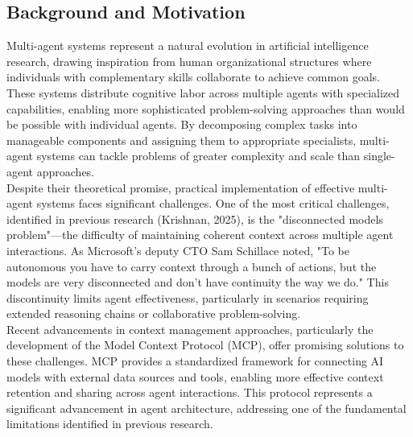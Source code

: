 \subsection{Background and Motivation}
Multi-agent systems represent a natural evolution in artificial intelligence research, drawing inspiration from human organizational structures where individuals with complementary skills collaborate to achieve common goals. These systems distribute cognitive labor across multiple agents with specialized capabilities, enabling more sophisticated problem-solving approaches than would be possible with individual agents. By decomposing complex tasks into manageable components and assigning them to appropriate specialists, multi-agent systems can tackle problems of greater complexity and scale than single-agent approaches.\\ \newline
Despite their theoretical promise, practical implementation of effective multi-agent systems faces significant challenges. One of the most critical challenges, identified in previous research (Krishnan, 2025), is the "disconnected models problem"—the difficulty of maintaining coherent context across multiple agent interactions. As Microsoft's deputy CTO Sam Schillace noted, "To be autonomous you have to carry context through a bunch of actions, but the models are very disconnected and don't have continuity the way we do." This discontinuity limits agent effectiveness, particularly in scenarios requiring extended reasoning chains or collaborative problem-solving.\\ \newline
Recent advancements in context management approaches, particularly the development of the Model Context Protocol (MCP), offer promising solutions to these challenges. MCP provides a standardized framework for connecting AI models with external data sources and tools, enabling more effective context retention and sharing across agent interactions. This protocol represents a significant advancement in agent architecture, addressing one of the fundamental limitations identified in previous research.\\
